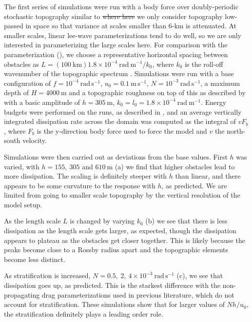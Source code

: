 \documentclass[twocol]{ametsocV5}
\providecommand{\DIFadd}[1]{{\protect\color{blue}\uwave{#1}}} %
\providecommand{\DIFdel}[1]{{\protect\color{red}\sout{#1}}}                      %
\providecommand{\DIFaddbegin}{} %
\providecommand{\DIFaddend}{} %
\providecommand{\DIFdelbegin}{} %
\providecommand{\DIFdelend}{} %
\begin{document}
The first series of simulations were run with a body force over doubly-periodic stochastic topography similar to \citet{klymak18}\DIFdelbegin \DIFdel{where here }\DIFdelend \DIFaddbegin \DIFadd{. Here }\DIFaddend we only consider topography low-passed in space so that variance at scales smaller than 6-km is attenuated.  At smaller scales, linear lee-wave parameterizations tend to do well, so we are only interested in parameterizing the large scales here.  For comparison with the parameterization (), we choose a representative horizontal spacing between obstacles as $L = \left(100 \ \mathrm{km}\right) 1.8 \times 10^{-4}\ \mathrm{rad\ m^{-1}} / k_0$, where $k_0$ is the roll-off wavenumber of the topographic spectrum \citep{klymak18}.  Simulations were run with a base configuration of $f=10^{-4}\ \mathrm{rad\, s^{-1}}$, $u_0=0.1\ \mathrm{m\,s^{-1}}$, $N=10^{-3}\ \mathrm{rad\, s^{-1}}$, a maximum depth of $H=4000\ \mathrm{m}$ and a topographic roughness on top of this as described by  with a basic amplitude of $h = 305\ \mathrm{m}$, $k_0 = l_0 = 1.8\times10^{-4}\ \mathrm{rad\ m^{-1}}$. Energy budgets were performed on the runs, as described in \citep{klymak18}, and an average vertically integrated dissipation rate across the domain was computed as the integral of $v F_b$, where $F_b$ is the y-direction body force used to force the model and $v$ the north-south velocity.


Simulations were then carried out as deviations from the base values.  First $h$ was varied, with $h = 155,\ 305$ and $610\ \mathrm{m}$ (a) we find that higher obstacles lead to more dissipation.  The scaling is definitely steeper with $h$ than linear, and there appears to be some curvature to the response with $h$, as predicted.  We are limited from going to smaller scale topography by the vertical resolution of the model setup.  


As the length scale $L$ is changed by varying  $k_0$ (b) we see that there is less dissipation as the length scale gets larger, as expected, though the dissipation appears to plateau as the obstacles get closer together.  This is likely because the peaks become close to a Rossby radius apart and the topographic elements become less distinct.  

As stratification is increased, $N = 0.5,\ 2,\ 4\times 10^{-3}\ \mathrm{rad\, s^{-1}}$ (c), we see that dissipation goes up, as predicted.  This is the starkest difference with the non-propagating drag parameterizations used in previous literature, which do not account for stratification.  These simulations show that for  larger values of $Nh/u_0$, the stratification definitely plays a leading order role.  
\end{document}

